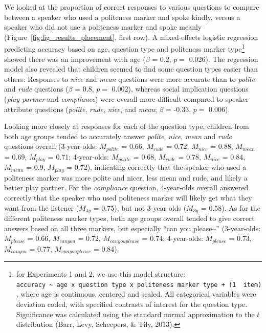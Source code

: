 \documentclass[10pt, letterpaper]{article}
\begin{document}
We looked at the proportion of correct responses to various questions to
compare between a speaker who used a politeness marker and spoke kindly,
versus a speaker who did not use a politeness marker and spoke meanly
(Figure~\ref{fig:fig_results_placement}, first row). A mixed-effects
logistic regression predicting accuracy based on age, question type and
politeness marker type\footnote{for Experiments 1 and 2, we use this
  model structure:
  \texttt{accuracy\ \textasciitilde{}\ age\ x\ question\ type\ x\ politeness\ marker\ type\ +\ (1\ \textbar{}\ item)},
  where age is continuous, centered and scaled. All categorical
  variables were deviation coded, with specified contrasts of interest
  for the question type. Significance was calculated using the standard
  normal approximation to the \(t\) distribution (Barr, Levy, Scheepers,
  \& Tily, 2013).} showed there was an improvement with age (\(\beta\) =
0.2, \(p =\) 0.026). The regression model also revealed that children
seemed to find some question types easier than others: Responses to
\emph{nice} and \emph{mean} questions were more accurate than to
\emph{polite} and \emph{rude} questions (\(\beta\) = 0.8, \(p =\)
0.002), whereas social implication questions (\emph{play partner} and
\emph{compliance}) were overall more difficult compared to speaker
attribute questions (\emph{polite}, \emph{rude}, \emph{nice}, and
\emph{mean}; \(\beta\) = -0.33, \(p =\) 0.006).

Looking more closely at responses for each of the question type,
children from both age groups tended to accurately answer \emph{polite},
\emph{nice}, \emph{mean} and \emph{rude} questions overall (3-year-olds:
\(M_{polite}\) = 0.66, \(M_{rude}\) = 0.72, \(M_{nice}\) = 0.88,
\(M_{mean}\) = 0.69, \(M_{play}\) = 0.71; 4-year-olds: \(M_{polite}\) =
0.68, \(M_{rude}\) = 0.78, \(M_{nice}\) = 0.84, \(M_{mean}\) = 0.9,
\(M_{play}\) = 0.72), indicating correctly that the speaker who used a
politeness marker was more polite and nicer, less mean and rude, and
likely a better play partner. For the \emph{compliance} question,
4-year-olds overall answered correctly that the speaker who used
politeness marker will likely get what they want from the listener
(\(M_{4y}\) = 0.75), but not 3-year-olds (\(M_{3y}\) = 0.58). As for the
different politeness marker types, both age groups overall tended to
give correct answers based on all three markers, but especially ``can
you please\textasciitilde{}'' (3-year-olds: \(M_{please}\) = 0.66,
\(M_{can you}\) = 0.72, \(M_{can you please}\) = 0.74; 4-year-olds:
\(M_{please}\) = 0.73, \(M_{can you}\) = 0.77, \(M_{can you please}\) =
0.84).
\end{document}
